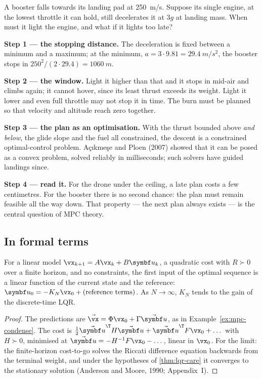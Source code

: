 \begin{example}
\label{ex:mpc-rocket}
A booster falls towards its landing pad at \SI{250}{m/s}. Suppose its single engine, at the lowest throttle it can hold, still decelerates it at $3g$ at landing mass. When must it light the engine, and what if it lights too late?

\textbf{Step 1 — the stopping distance.} The deceleration is fixed between a minimum and a maximum; at the minimum, $a = 3 \cdot 9.81 = \SI{29.4}{m/s^2}$, the booster stops in $250^2/(2 \cdot 29.4) = \SI{1060}{m}$.

\textbf{Step 2 — the window.} Light it higher than that and it stops in mid-air and climbs again; it cannot hover, since its least thrust exceeds its weight. Light it lower and even full throttle may not stop it in time. The burn must be planned so that velocity and altitude reach zero together.

\textbf{Step 3 — the plan as an optimisation.} With the thrust bounded above \emph{and below}, the glide slope and the fuel all constrained, the descent is a constrained optimal-control problem. Açıkmeşe and Ploen (2007) showed that it can be posed as a convex problem, solved reliably in milliseconds; such solvers have guided landings since.

\textbf{Step 4 — read it.} For the drone under the ceiling, a late plan costs a few centimetres. For the booster there is no second chance: the plan must remain feasible all the way down. That property — the next plan always exists — is the central question of MPC theory.
\end{example}

\subsection{In formal terms}

\begin{theorem}
\label{thm:mpc-linear}
For a linear model $\vx_{k+1} = A\vx_k + B\symbf u_k$, a quadratic cost with $R \succ 0$ over a finite horizon, and no constraints, the first input of the optimal sequence is a linear function of the current state and the reference: $\symbf u_0 = -K_{N}\vx_0 + \text{(reference terms)}$. As $N \to \infty$, $K_N$ tends to the gain of the discrete-time LQR.
\end{theorem}
\begin{proof}
The predictions are $\vec{\vx} = \Phi\vx_0 + \Gamma\vec{\symbf u}$, as in Example~\ref{ex:mpc-condense}. The cost is $\tfrac12\vec{\symbf u}^\T H\vec{\symbf u} + \vec{\symbf u}^\T F\vx_0 + \dots$ with $H \succ 0$, minimised at $\vec{\symbf u} = -H^{-1}F\vx_0 - \dots$, linear in $\vx_0$. For the limit: the finite-horizon cost-to-go solves the Riccati difference equation backwards from the terminal weight, and under the hypotheses of \cref{thm:lqr-care} it converges to the stationary solution (Anderson and Moore, 1990; Appendix~I).
\end{proof}

